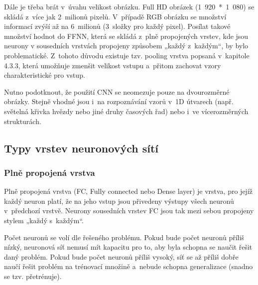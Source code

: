 \documentclass[a4paper,12pt]{article}
\begin{document}
{{{{Dále je třeba brát v~úvahu velikost obrázku. Full HD obrázek (1~920~*~1~080) se skládá z~více jak 2~milionů pixelů. V~případě RGB obrázku se množství informací zvýší až na 6~milionů (3~složky pro každý pixel). Posílat takové množství hodnot do FFNN, která se skládá z~plně propojených vrstev, kde jsou neurony v sousedních vrstvách propojeny způsobem „každý z~každým“, by bylo problematické. Z~tohoto důvodu existuje tzv. pooling vrstva popsaná v~kapitole 4.3.3, která umožňuje zmenšit velikost vstupu a~přitom zachovat vzory charakteristické pro vstup.

\drawgimp

Nutno podotknout, že použití CNN se neomezuje pouze na dvourozměrné obrázky. Stejně vhodné jsou i~na rozpoznávání vzorů v~1D útvarech (např. světelná křivka hvězdy nebo jiné druhy časových řad) nebo i~ve vícerozměrných strukturách.~\cite{convnn}

\subsection{Typy vrstev neuronových sítí}

\subsubsection{Plně propojená vrstva}

Plně propojená vrstva (FC, Fully connected nebo Dense layer) je vrstva, pro jejíž každý neuron platí, že na jeho vstup jsou přivedeny výstupy všech neuronů v~předchozí vrstvě. Neurony sousedních vrstev FC jsou tak mezi sebou propojeny stylem „každý s~každým“.

{

Počet neuronů se volí dle řešeného problému. Pokud bude počet neuronů příliš nízký, neuronová síť nemusí mít kapacitu pro to, aby byla schopna se naučit řešit daný problém. Pokud bude počet neuronů příliš vysoký, síť se až příliš dobře naučí řešit problém na trénovací množině a~nebude schopna generalizace (snadno se tzv. přetrénuje).

}}}}}
\end{document}
